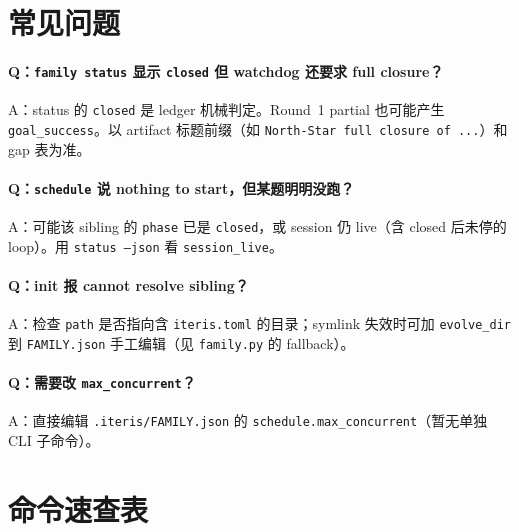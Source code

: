\documentclass[11pt,a4paper]{ctexart}
\begin{document}
\section{常见问题}

\paragraph{Q：\texttt{family status} 显示 \texttt{closed} 但 watchdog 还要求 full closure？}
A：status 的 \texttt{closed} 是 ledger 机械判定。Round~1 partial 也可能产生 \texttt{goal\_success}。以 artifact 标题前缀（如 \texttt{North-Star full closure of ...}）和 gap 表为准。

\paragraph{Q：\texttt{schedule} 说 nothing to start，但某题明明没跑？}
A：可能该 sibling 的 \texttt{phase} 已是 \texttt{closed}，或 session 仍 live（含 closed 后未停的 loop）。用 \texttt{status --json} 看 \texttt{session\_live}。

\paragraph{Q：init 报 cannot resolve sibling？}
A：检查 \texttt{path} 是否指向含 \texttt{iteris.toml} 的目录；symlink 失效时可加 \texttt{evolve\_dir} 到 \texttt{FAMILY.json} 手工编辑（见 \texttt{family.py} 的 fallback）。

\paragraph{Q：需要改 \texttt{max\_concurrent}？}
A：直接编辑 \texttt{.iteris/FAMILY.json} 的 \texttt{schedule.max\_concurrent}（暂无单独 CLI 子命令）。

\section{命令速查表}
\end{document}
